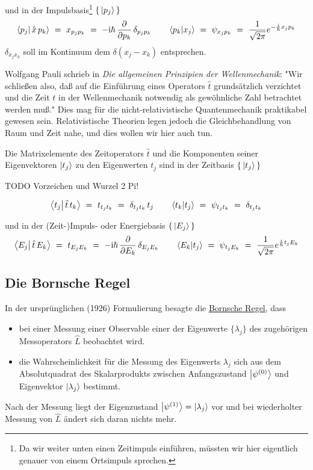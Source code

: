 \documentclass[12pt]{article}
\begin{document}
und in der Impulsbasis\footnote{Da wir weiter unten einen Zeitimpuls einführen, müssten wir hier eigentlich genauer von einem Ortsimpuls sprechen.} $\{\,\ket{p_j}\,\}$
\begin{equation}
\bra{p_j}\ket{\,\hat{x}\,p_k}\ =\ x_{p_j p_k}\ =\ 
-\mathrm{i}\hbar\,\frac{\partial}{\partial p_k}\,\delta_{p_j p_k}
\quad\quad 
\bra{p_k}\ket{x_j}\ =\ \psi_{x_j p_k}\ =\ 
\frac{1}{\sqrt{2\pi}} e^{-\frac{i}{\hbar}x_j p_k}
\end{equation}
$\delta_{x_j x_k}$ soll im Kontinuum dem $\delta(x_j - x_k)$ entsprechen.

Wolfgang Pauli schrieb in \emph{Die allgemeinen Prinzipien der Wellenmechanik}: "Wir schließen also, daß auf die Einführung eines Operators $\hat{t}$ grundsätzlich verzichtet und die Zeit $t$ in der Wellenmechanik notwendig als gewöhnliche Zahl betrachtet werden muß." Dies mag für die nicht-relativistische Quantenmechanik praktikabel gewesen sein. Relativistische Theorien legen jedoch die Gleichbehandlung von Raum und Zeit nahe, und dies wollen wir hier auch tun.

Die Matrixelemente des Zeitoperators $\hat{t}$ und die Komponenten seiner Eigenvektoren $\ket{t_j}$ zu den Eigenwerten $t_j$ sind in der Zeitbasis $\{\,\ket{t_j}\,\}$

TODO Vorzeichen und Wurzel 2 Pi!

\begin{equation}
\bra{t_j}\ket{\,\hat{t}\,t_k}\ =\ t_{t_j t_k}\ =\ \delta_{t_j t_k}\,t_j
\quad\quad 
\bra{t_k}\ket{t_j}\ =\ \psi_{t_j t_k}\ =\ \delta_{t_j t_k}
\end{equation}

und in der (Zeit-)Impuls- oder Energiebasis $\{\,\ket{E_j}\,\}$
\begin{equation}
\label{eq:time_components}
\bra{E_j}\ket{\,\hat{t}\,E_k}\ =\ t_{E_j E_k}\ =\ 
-\mathrm{i}\hbar\,\frac{\partial}{\partial E_k}\,\delta_{E_j E_k}
\quad\quad 
\bra{E_k}\ket{t_j}\ =\ \psi_{t_j E_k}\ =\ 
\frac{1}{\sqrt{2\pi}} e^{\frac{i}{\hbar}t_j E_k}
\end{equation}

\subsection{Die Bornsche Regel}

In der ursprünglichen (1926) Formulierung besagte die \href{https://en.wikipedia.org/wiki/Born_rule}{Bornsche Regel}, dass 
\begin{itemize}
\item bei einer Messung einer Observable einer der Eigenwerte $\{\lambda_j\}$ des zugehörigen Messoperators $\hat{L}$ beobachtet wird.
\item die Wahrscheinlichkeit für die Messung des Eigenwerts $\lambda_j$ sich aus dem Absolutquadrat des Skalarprodukts zwischen Anfangszustand $\ket{\psi^{(0)}}$ und Eigenvektor $\ket{\lambda_j}$ bestimmt.
\end{itemize}
Nach der Messung liegt der Eigenzustand $\ket{\psi^{(1)}} = \ket{\lambda_j}$ vor und bei wiederholter Messung von $\hat{L}$ ändert sich daran nichts mehr. 
\end{document}
